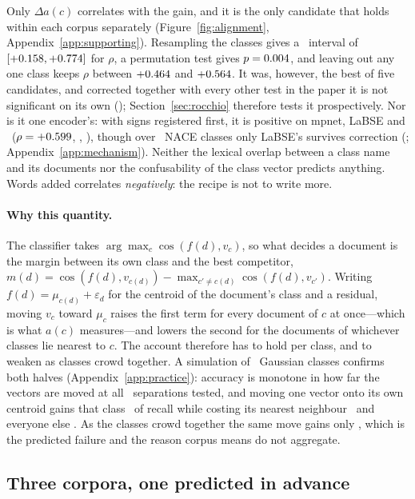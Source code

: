 \documentclass[11pt]{article}
\begin{document}
Only $\Delta a(c)$ correlates with the gain, and it is the only candidate that
holds within each corpus separately (Figure~\ref{fig:alignment},
Appendix~\ref{app:supporting}). Resampling the classes gives a
\CILevel\ interval of $[+0.158, +0.774]$ for $\rho$, a permutation test
gives $p = 0.004$, and leaving out any one class keeps $\rho$ between
$+0.464$ and $+0.564$. It was, however, the best of five candidates,
and corrected together with every other test in the paper it is not significant
on its own (\HolmAlignStat); Section~\ref{sec:rocchio} therefore tests it
prospectively. Nor is it one encoder's: with signs registered first, it is
positive on mpnet, LaBSE and \BgeModel\ ($\rho = +0.599$,
\MechLabseRho, \MechBgeRho), though over \MechMpnetN\ NACE classes only
LaBSE's survives correction (\HolmMechLabseStat; Appendix~\ref{app:mechanism}). Neither the lexical overlap between a class name and its
documents nor the confusability of the class vector predicts anything. Words
added correlates \emph{negatively}: the recipe is not to write more.

\paragraph{Why this quantity.} The classifier takes
$\arg\max_c \cos(f(d), v_c)$, so what decides a document is the margin between
its own class and the best competitor,
$m(d) = \cos(f(d), v_{c(d)}) - \max_{c' \neq c(d)} \cos(f(d), v_{c'})$. Writing
$f(d) = \mu_{c(d)} + \varepsilon_d$ for the centroid of the document's class and
a residual, moving $v_c$ toward $\mu_c$ raises the first term for every document
of $c$ at once---which is what $a(c)$ measures---and lowers the second for the
documents of whichever classes lie nearest to $c$. The account therefore has to
hold per class, and to weaken as classes crowd together. A simulation of
\SynthClasses\ Gaussian classes confirms both halves (Appendix~\ref{app:practice}):
accuracy is monotone in how far the vectors are moved at all
\SynthSeparations\ separations tested, and moving one vector onto its own
centroid gains that class \SynthOwnGain\ of recall while costing its nearest
neighbour \SynthNeighbourLoss\ and everyone else \SynthOtherChange. As the
classes crowd together the same move gains only \SynthNarrowOwnGain, which is
the predicted failure and the reason corpus means do not aggregate.

\subsection{Three corpora, one predicted in advance}
\label{sec:corpora}
\end{document}
